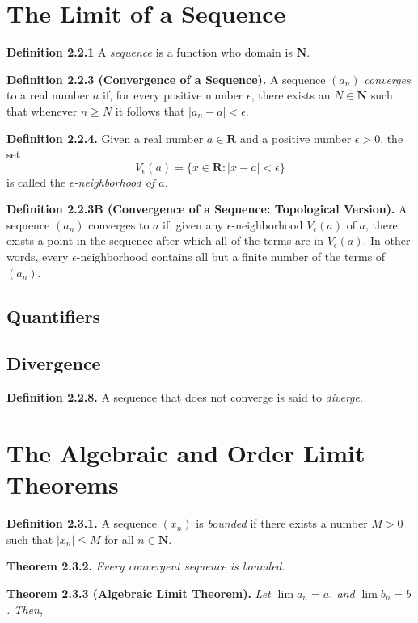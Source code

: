 \documentclass[12pt]{report}
\newcommand{\R}{\textbf{R}}
\newcommand{\N}{\textbf{N}}
\begin{document}
\section{The Limit of a Sequence}

\noindent \textbf{Definition 2.2.1} A \textit{sequence} is a function who domain is $\N$.
\bigskip

\noindent \textbf{Definition 2.2.3 (Convergence of a Sequence).} A sequence $(a_n)$ \textit{converges} to a real number $a$ if, for every positive number $\epsilon$, there exists an $N\in\N$ such that whenever $n\geq N$ it follows that $|a_n-a|<\epsilon$.
\bigskip

\noindent \textbf{Definition 2.2.4.} Given a real number $a\in\R$ and a positive number $\epsilon>0$, the set
\[V_\epsilon(a)=\{x\in\R:|x-a|<\epsilon\}\]
\noindent is called the \textit{$\epsilon$-neighborhood of $a$.}
\bigskip

\noindent \textbf{Definition 2.2.3B (Convergence of a Sequence: Topological Version).} A sequence $(a_n)$ converges to $a$ if, given any $\epsilon$-neighborhood $V_\epsilon(a)$ of $a$, there exists a point in the sequence after which all of the terms are in $V_\epsilon(a)$.  In other words, every $\epsilon$-neighborhood contains all but a finite number of the terms of $(a_n)$.
\bigskip

\subsection*{Quantifiers}
\subsection*{Divergence}

\noindent \textbf{Definition 2.2.8.} A sequence that does not converge is said to \textit{diverge}.
\bigskip

\section{The Algebraic and Order Limit Theorems}

\noindent \textbf{Definition 2.3.1.} A sequence $(x_n)$ is \textit{bounded} if there exists a number $M>0$ such that $|x_n|\leq M$ for all $n\in\N$.
\bigskip

\noindent \textbf{Theorem 2.3.2.} \textit{Every convergent sequence is bounded.}
\bigskip

\noindent \textbf{Theorem 2.3.3 (Algebraic Limit Theorem).} \textit{Let $\lim a_n=a$, and $\lim b_n=b$.  Then,}
\end{document}
